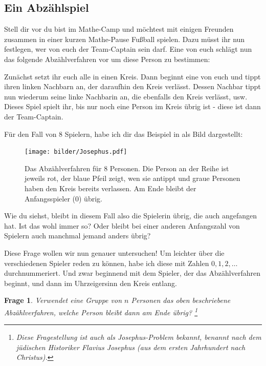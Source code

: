 \documentclass[a4paper,ngerman,12pt]{scrartcl}
\theoremstyle{definition}
\theoremstyle{plain}
\newtheorem{frage}[defn]{Frage}
\theoremstyle{remark}
\begin{document}
\subsection{Ein Abzählspiel}

Stell dir vor du bist im Mathe-Camp und möchtest mit einigen Freunden zusammen in einer kurzen Mathe-Pause Fußball spielen. Dazu müsst ihr nun festlegen, wer von euch der Team-Captain sein darf. Eine von euch schlägt nun das folgende Abzählverfahren vor um diese Person zu bestimmen:

Zunächst setzt ihr euch alle in einen Kreis. Dann beginnt eine von euch und tippt ihren linken Nachbarn an, der daraufhin den Kreis verlässt. Dessen Nachbar tippt nun wiederum seine linke Nachbarin an, die ebenfalls den Kreis verlässt, usw. Dieses Spiel spielt ihr, bis nur noch eine Person im Kreis übrig ist - diese ist dann der Team-Captain.

Für den Fall von $8$ Spielern, habe ich dir das Beispiel in  als Bild dargestellt:

\begin{figure}[h]\centering
	\texttt{[image: bilder/Josephus.pdf]}
	\caption{Das Abzählverfahren für $8$ Personen. Die Person an der Reihe ist jeweils rot, der blaue Pfeil zeigt, wen sie antippt und graue Personen haben den Kreis bereits verlassen. Am Ende bleibt der Anfangsspieler ($0$) übrig.}
	\label{Abb:JosephusBsp}
\end{figure}

Wie du siehst, bleibt in diesem Fall also die Spielerin übrig, die auch angefangen hat. Ist das wohl immer so? Oder bleibt bei einer anderen Anfangszahl von Spielern auch manchmal jemand anders übrig? 

Diese Frage wollen wir nun genauer untersuchen! Um leichter über die verschiedenen Spieler reden zu können, habe ich diese mit Zahlen $0, 1, 2, \dots$ durchnummeriert. Und zwar beginnend mit dem Spieler, der das Abzählverfahren beginnt, und dann im Uhrzeigersinn den Kreis entlang.

\begin{frage}
	Verwendet eine Gruppe von $n$ Personen das oben beschriebene Abzählverfahren, welche Person bleibt dann am Ende übrig?
	\footnote{Diese Fragestellung ist auch als Josephus-Problem bekannt, benannt nach dem jüdischen Historiker Flavius Josephus (aus dem ersten Jahrhundert nach Christus).}
\end{frage}
\end{document}
